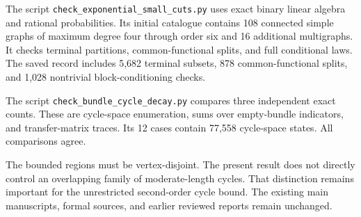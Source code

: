 \documentclass[11pt]{article}
\begin{document}
The script \nolinkurl{check_exponential_small_cuts.py} uses exact binary linear algebra and rational probabilities.
Its initial catalogue contains 108 connected simple graphs of maximum degree four through order six and 16 additional multigraphs.
It checks terminal partitions, common-functional splits, and full conditional laws.
The saved record includes 5,682 terminal subsets, 878 common-functional splits, and 1,028 nontrivial block-conditioning checks.

The script \nolinkurl{check_bundle_cycle_decay.py} compares three independent exact counts.
These are cycle-space enumeration, sums over empty-bundle indicators, and transfer-matrix traces.
Its 12 cases contain 77,558 cycle-space states.
All comparisons agree.

The bounded regions must be vertex-disjoint.
The present result does not directly control an overlapping family of moderate-length cycles.
That distinction remains important for the unrestricted second-order cycle bound.
The existing main manuscripts, formal sources, and earlier reviewed reports remain unchanged.
\end{document}
